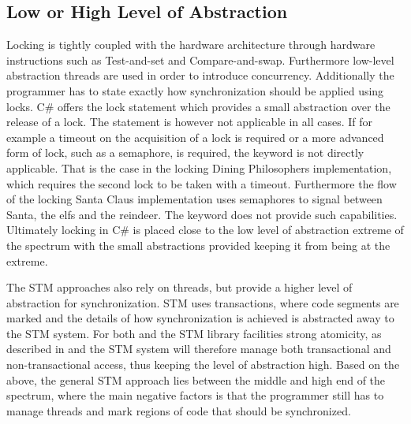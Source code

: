 \subsection{Low or High Level of Abstraction}\label{subsec:level_of_abstraction}
Locking is tightly coupled with the hardware architecture through hardware instructions such as Test-and-set and Compare-and-swap\cite[p. 1990]{scott2011sync}. Furthermore low-level abstraction threads are used in order to introduce concurrency. Additionally the programmer has to state exactly how synchronization should be applied using locks. C\# offers the lock  statement which provides a small abstraction over the release of a lock. The  statement is however not applicable in all cases. If for example a timeout on the acquisition of a lock is required or a more advanced form of lock, such as a semaphore, is required, the  keyword is not directly applicable. That is the case in the locking Dining Philosophers implementation, which requires the second lock to be taken with a timeout. Furthermore the flow of the locking Santa Claus implementation uses semaphores to signal between Santa, the elfs and the reindeer. The  keyword does not provide such capabilities. Ultimately locking in C\# is placed close to the low level of abstraction extreme of the spectrum with the small abstractions provided keeping it from being at the extreme. 

The \ac{STM} approaches also rely on threads, but provide a higher level of abstraction for synchronization. \ac{STM} uses transactions, where code segments are marked and the details of how synchronization is achieved is abstracted away to the \ac{STM} system. For both \stmname and the \ac{STM} library facilities strong atomicity, as described in  and the \ac{STM} system will therefore manage both transactional and non-transactional access, thus keeping the level of abstraction high. Based on the above, the general \ac{STM} approach lies between the middle and high end of the spectrum, where the main negative factors is that the programmer still has to manage threads and mark regions of code that should be synchronized.

